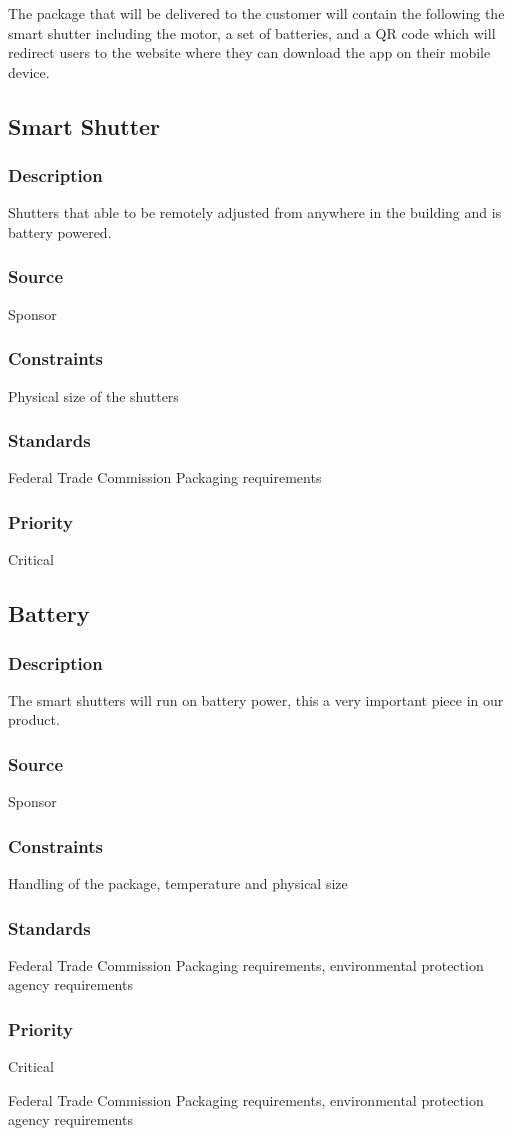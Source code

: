 The package that will be delivered to the customer will contain the following the smart shutter including the motor, a set of batteries, and  a QR code which will redirect users to the website where they can download the app on their mobile device.

\subsection{Smart Shutter}
\subsubsection{Description}
Shutters that able to be remotely adjusted from anywhere in the building and is battery powered.
\subsubsection{Source}
Sponsor
\subsubsection{Constraints}
Physical size of the shutters
\subsubsection{Standards}
Federal Trade Commission Packaging requirements 
\subsubsection{Priority}
Critical

\subsection{Battery}
\subsubsection{Description}
The smart shutters will run on battery power, this a very important piece in our product.

\subsubsection{Source}
Sponsor
\subsubsection{Constraints}
Handling of the package, temperature and physical size
\subsubsection{Standards}
Federal Trade Commission Packaging requirements, environmental protection agency requirements
\subsubsection{Priority}
Critical

Federal Trade Commission Packaging requirements, environmental protection agency requirements
